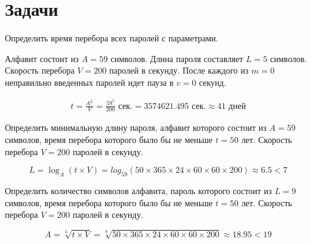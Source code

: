 \section{Задачи}

\begin{problem}
  Определить время перебора всех паролей с параметрами. 

  Алфавит состоит из $A=59$ символов. Длина пароля составляет $L=5$ символов.
  Скорость перебора $V=200$ паролей в секунду. После каждого из $m=0$
  неправильно введенных паролей идет пауза в $v=0$ секунд.
\end{problem}

\begin{solution}
  \begin{gather}
    t = \frac{A^L}{V} = \frac{59^5}{200} \text{ сек}.
    = 3574621.495 \text{ сек}.
    \approx 41 \text{ дней}
  \end{gather}
\end{solution}

\begin{problem}
  Определить минимальную длину пароля, алфавит которого состоит из $A=59$
  символов, время перебора которого было бы не меньше $t=50$ лет. Скорость
  перебора $V=200$ паролей в секунду.
\end{problem}

\begin{solution}
  \begin{equation}
    L = \log_A(t \times V) = log_{59}(50 \times 365 \times 24 \times 60
    \times 60 \times 200) \approx 6.5 < 7
  \end{equation}
\end{solution}

\begin{problem}
  Определить количество символов алфавита, пароль которого состоит из $L=9$
  символов, время перебора которого было бы не меньше $t=50$ лет. Скорость
  перебора $V=200$ паролей в секунду.
\end{problem}

\begin{solution}
  \begin{equation}
    A = \sqrt[L]{t \times V} =
    \sqrt[9]{50 \times 365 \times 24 \times 60 \times 60 \times 200}
    \approx 18.95 < 19
  \end{equation}
\end{solution}
